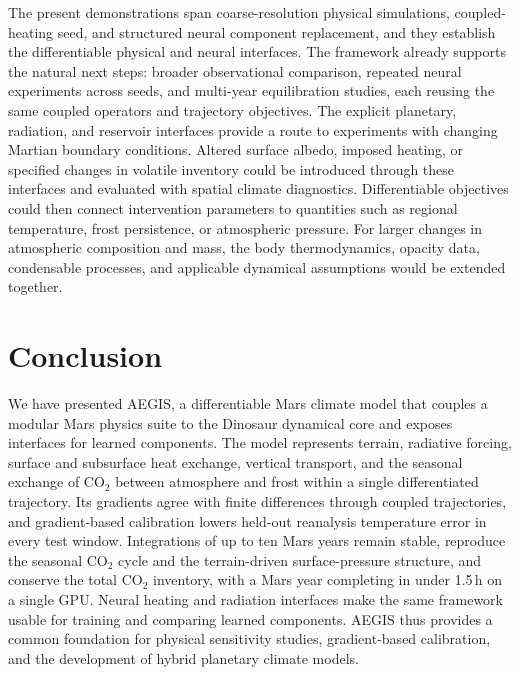 \documentclass{article} %
\newcommand{\co}{CO$_2$}
\begin{document}
The present demonstrations span coarse-resolution physical simulations, coupled-heating seed, and structured neural component replacement, and they establish the differentiable physical and neural interfaces. The framework already supports the natural next steps: broader observational comparison, repeated neural experiments across seeds, and multi-year equilibration studies, each reusing the same coupled operators and trajectory objectives. The explicit planetary, radiation, and reservoir interfaces provide a route to experiments with changing Martian boundary conditions. Altered surface albedo, imposed heating, or specified changes in volatile inventory could be introduced through these interfaces and evaluated    with spatial climate diagnostics. Differentiable objectives could then connect intervention parameters to quantities such as regional temperature, frost persistence, or atmospheric pressure. For larger changes in atmospheric composition and mass, the body thermodynamics, opacity data, condensable processes, and applicable dynamical assumptions would be extended together. 


\section{Conclusion}                                                      
We have presented AEGIS, a differentiable Mars climate model that couples 
 a modular Mars physics suite to the Dinosaur dynamical core and exposes     
 interfaces for learned components. The model represents terrain, radiative  
 forcing, surface and subsurface heat exchange, vertical transport, and the  
 seasonal exchange of \co{} between atmosphere and frost within a single     
 differentiated trajectory. Its gradients agree with finite differences      
 through coupled trajectories, and gradient-based calibration lowers         
 held-out reanalysis temperature error in every test window. Integrations of 
 up to ten Mars years remain stable, reproduce the seasonal \co{} cycle and  
 the terrain-driven surface-pressure structure, and conserve the total \co{} 
 inventory, with a Mars year completing in under 1.5\,h on a single GPU.     
 Neural heating and radiation interfaces make the same framework usable for  
 training and comparing learned components. AEGIS thus provides a common     
 foundation for physical sensitivity studies, gradient-based calibration,    
 and the development of hybrid planetary climate models.
\end{document}
